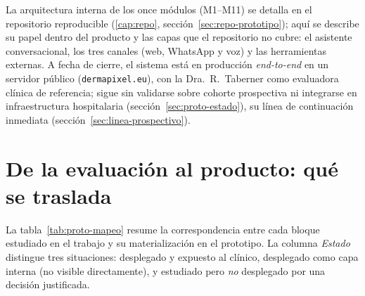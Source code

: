 La arquitectura interna de los once módulos (M1--M11) se detalla en el
repositorio reproducible (\ref{cap:repo}, sección~\ref{sec:repo-prototipo});
aquí se describe su papel dentro del producto y las capas que el
repositorio no cubre: el asistente conversacional, los tres canales (web,
WhatsApp y voz) y las herramientas externas. A fecha de cierre, el sistema
está en producción \emph{end-to-end} en un servidor público
(\texttt{dermapixel.eu}), con la Dra.~R.~Taberner como evaluadora clínica de
referencia; sigue sin validarse sobre cohorte prospectiva ni integrarse en
infraestructura hospitalaria (sección~\ref{sec:proto-estado}), su línea de
continuación inmediata (sección~\ref{sec:linea-prospectivo}).


\section{De la evaluación al producto: qué se traslada}
\label{sec:proto-mapeo}

La tabla~\ref{tab:proto-mapeo} resume la correspondencia entre cada bloque
estudiado en el trabajo y su materialización en el prototipo. La columna
\emph{Estado} distingue tres situaciones: desplegado y expuesto al
clínico, desplegado como capa interna (no visible directamente), y
estudiado pero \emph{no} desplegado por una decisión justificada.


